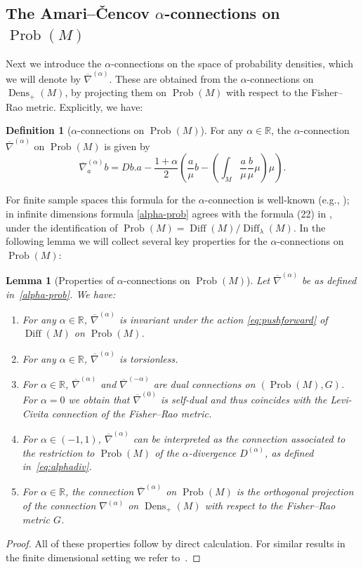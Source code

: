 \documentclass[11pt,reqno]{amsart}
\newtheorem{lemma}[theorem]{Lemma}
\theoremstyle{definition}
\newtheorem{definition}[theorem]{Definition}
\newcommand{\R}{\mathbb R}
\newcommand{\dx}{\lambda}
\newcommand{\Prob}{\operatorname{Prob}(M)}
\newcommand{\Dens}{\operatorname{Dens}_+(M)}
\newcommand{\Diff}{\operatorname{Diff}(M)}
\newcommand{\SDiff}{\operatorname{Diff}_{\dx}(M)}
\newcommand{\GFR}{G}
\newcommand{\nablabar}{\overline{\nabla}}
\begin{document}
\subsection{The Amari--\v{C}encov $\alpha$-connections on $\Prob$}
Next we introduce the $\alpha$-connections on the space of probability densities, which we will denote by  $\nablabar^{(\alpha)}$. 
These are obtained from the $\alpha$-connections on $\Dens$, by projecting them on $\Prob$ with respect to the Fisher--Rao metric. Explicitly, we have: 
\begin{definition}[$\alpha$-connections on $\Prob$]
 For any $\alpha\in \mathbb R$, the $\alpha$-connection $\nablabar^{(\alpha)}$ on $\Prob$ is given by
    \begin{equation}\label{alpha-prob}
    \nablabar^{(\alpha)}_a b = Db.a - \frac{1+\alpha}{2} \left(\frac{a}{\mu}b -\left(\int_M \frac{a}{\mu}\frac{b}{\mu} \mu\right)\mu\right).
    \end{equation}
\end{definition}
For finite sample spaces this formula for the $\alpha$-connection is well-known (e.g., \cite[Section~2.5.2]{ay2017information});
in infinite dimensions formula \eqref{alpha-prob} agrees with the formula (22) in \cite{lenells2014amari}, under the identification of $\Prob = \Diff/\SDiff$. In the following lemma we will collect several key properties for the $\alpha$-connections on $\Prob$:
\begin{lemma}[Properties of $\alpha$-connections on $\Prob$]
Let $\nablabar^{(\alpha)}$ be as defined in~\eqref{alpha-prob}. We have:
\begin{enumerate}[label=$(\alph*)$]
\item\label{prob_prop1} For any $\alpha\in \mathbb R$, %
$\nablabar^{(\alpha)}$ is invariant under the action \eqref{eq:pushforward} of $\Diff$ on $\Prob$. 
\item For any $\alpha\in \R$, $\nablabar^{(\alpha)}$ is torsionless.
\item\label{prob_prop2} For $\alpha\in \mathbb R$, $\nablabar^{(\alpha)}$ and $\nablabar^{(-\alpha)}$ are dual connections on $(\Prob,\GFR)$. 
For $\alpha=0$ we obtain that $\nablabar^{(0)}$ is self-dual and thus coincides with the Levi-Civita connection of the Fisher--Rao metric.  
\item\label{prob_prop3} For $\alpha\in (-1,1)$, $\nablabar^{(\alpha)}$ 
can be interpreted as the connection associated to the restriction to $\Prob$ of the $\alpha$-divergence $D^{(\alpha)}$, as defined in~\eqref{eq:alphadiv}.
\item\label{prob_prop4} For $\alpha\in \mathbb R$, the connection  $\nablabar^{(\alpha)}$ on $\Prob$ is the orthogonal projection of the connection $\nabla^{(\alpha)}$ on $\Dens$ with respect to the Fisher--Rao metric $\GFR$. 
\end{enumerate}
\end{lemma}
\begin{proof}
All of these properties follow by direct calculation. For similar results in the finite dimensional setting we refer to~\cite[Section 2.5]{ay2017information}. 
\end{proof}
\end{document}

